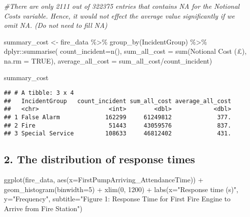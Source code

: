 \documentclass[
]{article}
\newenvironment{Shaded}{\begin{snugshade}}{\end{snugshade}}
\newcommand{\AttributeTok}[1]{\textcolor[rgb]{0.77,0.63,0.00}{#1}}
\newcommand{\CommentTok}[1]{\textcolor[rgb]{0.56,0.35,0.01}{\textit{#1}}}
\newcommand{\ConstantTok}[1]{\textcolor[rgb]{0.00,0.00,0.00}{#1}}
\newcommand{\DecValTok}[1]{\textcolor[rgb]{0.00,0.00,0.81}{#1}}
\newcommand{\FunctionTok}[1]{\textcolor[rgb]{0.00,0.00,0.00}{#1}}
\newcommand{\NormalTok}[1]{#1}
\newcommand{\OtherTok}[1]{\textcolor[rgb]{0.56,0.35,0.01}{#1}}
\newcommand{\SpecialCharTok}[1]{\textcolor[rgb]{0.00,0.00,0.00}{#1}}
\newcommand{\StringTok}[1]{\textcolor[rgb]{0.31,0.60,0.02}{#1}}
\begin{document}
\begin{Shaded}
\begin{Highlighting}[]
\CommentTok{\#There are only 2111 out of 322375 entries that contains NA for the Notional Costs variable. Hence, it would not effect the average value significantly if we omit NA. (Do not need to fill NA)}
\end{Highlighting}
\end{Shaded}

\begin{Shaded}
\begin{Highlighting}[]
\NormalTok{summary\_cost }\OtherTok{\textless{}{-}}\NormalTok{ fire\_data }\SpecialCharTok{\%\textgreater{}\%} 
    \FunctionTok{group\_by}\NormalTok{(IncidentGroup) }\SpecialCharTok{\%\textgreater{}\%} 
\NormalTok{    dplyr}\SpecialCharTok{::}\FunctionTok{summarise}\NormalTok{(}
        \AttributeTok{count\_incident=}\FunctionTok{n}\NormalTok{(),}
        \AttributeTok{sum\_all\_cost =} \FunctionTok{sum}\NormalTok{(}\StringTok{\textasciigrave{}}\AttributeTok{Notional Cost (£)}\StringTok{\textasciigrave{}}\NormalTok{, }\AttributeTok{na.rm =} \ConstantTok{TRUE}\NormalTok{), }
        \AttributeTok{average\_all\_cost =}\NormalTok{ sum\_all\_cost}\SpecialCharTok{/}\NormalTok{count\_incident)}

\NormalTok{summary\_cost}
\end{Highlighting}
\end{Shaded}

\begin{verbatim}
## # A tibble: 3 x 4
##   IncidentGroup   count_incident sum_all_cost average_all_cost
##   <chr>                    <int>        <dbl>            <dbl>
## 1 False Alarm             162299     61249812             377.
## 2 Fire                     51443     43059576             837.
## 3 Special Service         108633     46812402             431.
\end{verbatim}

\hypertarget{the-distribution-of-response-times}{%
\subsection{2. The distribution of response
times}\label{the-distribution-of-response-times}}

\begin{Shaded}
\begin{Highlighting}[]
\FunctionTok{ggplot}\NormalTok{(fire\_data, }\FunctionTok{aes}\NormalTok{(}\AttributeTok{x=}\NormalTok{FirstPumpArriving\_AttendanceTime)) }\SpecialCharTok{+} 
    \FunctionTok{geom\_histogram}\NormalTok{(}\AttributeTok{binwidth=}\DecValTok{5}\NormalTok{) }\SpecialCharTok{+} 
    \FunctionTok{xlim}\NormalTok{(}\DecValTok{0}\NormalTok{, }\DecValTok{1200}\NormalTok{) }\SpecialCharTok{+}
    \FunctionTok{labs}\NormalTok{(}\AttributeTok{x=}\StringTok{"Response time (s)"}\NormalTok{, }
         \AttributeTok{y=}\StringTok{"Frequency"}\NormalTok{, }
         \AttributeTok{subtitle=}\StringTok{"Figure 1: Response Time for First Fire Engine to Arrive from Fire Station"}\NormalTok{)}
\end{Highlighting}
\end{Shaded}
\end{document}
